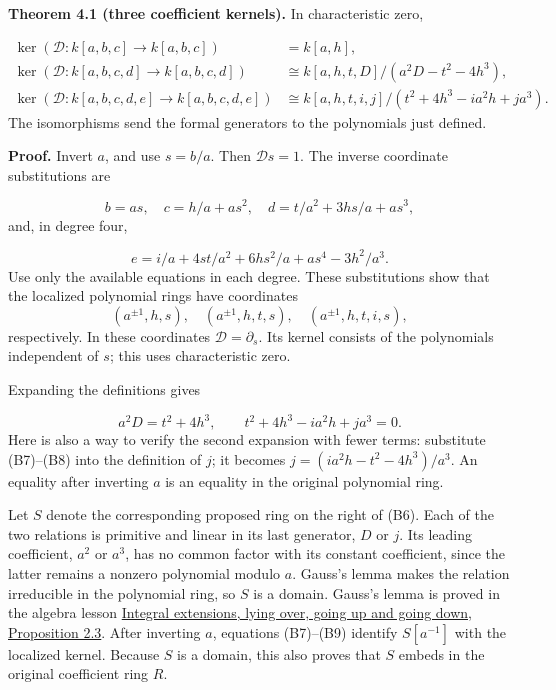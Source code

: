 \documentclass[
]{article}
\begin{document}
\protect{}\label{theorem-4-1}{}

\textbf{Theorem 4.1 (three coefficient kernels).} In characteristic
zero, \protect{}\label{equation-B6}{}

\[
\begin{aligned}
\ker(\mathcal D:k [a,b,c]\to k [a,b,c])&=k [a,h],\\
\ker(\mathcal D:k [a,b,c,d]\to k [a,b,c,d])
&\cong k [a,h,t,D]/(a^2D-t^2-4h^3),\\
\ker(\mathcal D:k [a,b,c,d,e]\to k [a,b,c,d,e])
&\cong k [a,h,t,i,j]/(t^2+4h^3-ia^2h+ja^3).
\end{aligned}
\tag{B6}
\] The isomorphisms send the formal generators to the polynomials just
defined.

\textbf{Proof.} Invert \(a\), and use \(s=b/a\). Then \(\mathcal Ds=1\).
The inverse coordinate substitutions are
\protect{}\label{equation-B7}{}

\[
b=as,\quad c=h/a+as^2,\quad
d=t/a^2+3hs/a+as^3,
\tag{B7}
\] and, in degree four, \protect{}\label{equation-B8}{}

\[
e=i/a+4st/a^2+6hs^2/a+as^4-3h^2/a^3.
\tag{B8}
\] Use only the available equations in each degree. These substitutions
show that the localized polynomial rings have coordinates \[
(a^{\pm1},h,s),\quad (a^{\pm1},h,t,s),\quad
(a^{\pm1},h,t,i,s),
\] respectively. In these coordinates \(\mathcal D=\partial_s\). Its
kernel consists of the polynomials independent of \(s\); this uses
characteristic zero.

Expanding the definitions gives
\protect{}\label{equation-B9}{}

\[
a^2D=t^2+4h^3,\qquad
t^2+4h^3-ia^2h+ja^3=0.
\tag{B9}
\] Here is also a way to verify the second expansion with fewer terms:
substitute (B7)--(B8) into the definition of \(j\); it becomes
\(j=(ia^2h-t^2-4h^3)/a^3\). An equality after inverting \(a\) is an
equality in the original polynomial ring.

Let \(S\) denote the corresponding proposed ring on the right of (B6).
Each of the two relations is primitive and linear in its last generator,
\(D\) or \(j\). Its leading coefficient, \(a^2\) or \(a^3\), has no
common factor with its constant coefficient, since the latter remains a
nonzero polynomial modulo \(a\). Gauss's lemma makes the relation
irreducible in the polynomial ring, so \(S\) is a domain. Gauss's lemma
is proved in the algebra lesson
\href{../AG-CA/AG-CA-05.html\#2-integral-closure-survives-localization}{Integral
extensions, lying over, going up and going down, Proposition 2.3}. After
inverting \(a\), equations (B7)--(B9) identify \(S [a^{-1}]\) with the
localized kernel. Because \(S\) is a domain, this also proves that \(S\)
embeds in the original coefficient ring \(R\).
\end{document}

